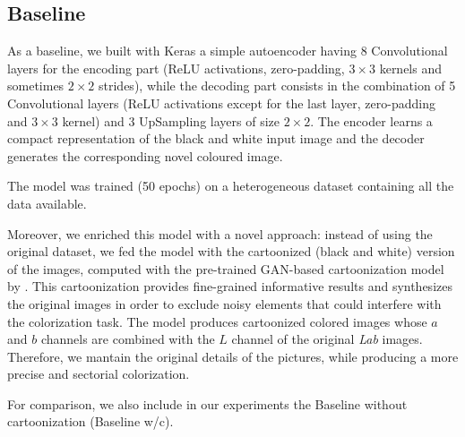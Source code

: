\subsection{Baseline}
As a baseline, we built with Keras a simple autoencoder having 8 Convolutional layers for the encoding part
(ReLU activations, zero-padding, $3\times3$ kernels and sometimes $2\times2$ strides), while the decoding part
consists in the combination of 5 Convolutional layers (ReLU activations except for the last layer, zero-padding
and $3\times3$ kernel) and 3 UpSampling layers of size $2\times2$. The encoder learns a compact representation
of the black and white input image and the decoder generates the corresponding novel coloured image.

The model was trained (50 epochs) on a heterogeneous dataset containing all the data available.

Moreover, we enriched this model with a novel approach: instead of using the original dataset, we fed the model
with the cartoonized (black and white) version of the images, computed with the pre-trained GAN-based cartoonization
model by \cite{cartoonize}. This cartoonization provides fine-grained informative results 
and synthesizes the original images in order to exclude noisy elements that could interfere with the colorization
task. The model produces cartoonized colored images whose $a$ and $b$ channels are combined with the $L$ channel
of the original \textit{Lab} images. Therefore, we mantain the original details of the pictures, while producing a
more precise and sectorial colorization.

For comparison, we also include in our experiments the Baseline without cartoonization (Baseline w/c).